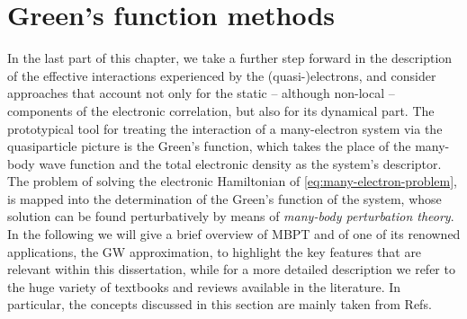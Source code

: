 \section{Green's function methods\label{sec:green-function-methods}}
In the last part of this chapter, we take a further step forward in the description of the effective interactions experienced by the (quasi-)electrons, and consider approaches that account not only for the static -- although non-local -- components of the electronic correlation, but also for its dynamical part. The prototypical tool for treating the interaction of a many-electron system via the quasiparticle picture is the Green's function, which takes the place of the many-body wave function and the total electronic density as the system's descriptor. The problem of solving the electronic Hamiltonian of \cref{eq:many-electron-problem}, is mapped into the determination of the Green's function of the system, whose solution can be found perturbatively by means of \emph{many-body perturbation theory}. In the following we will give a brief overview of MBPT and of one of its renowned applications, the GW approximation, to highlight the key features that are relevant within this dissertation, while for a more detailed description we refer to the huge variety of textbooks and reviews available in the literature. In particular, the concepts discussed in this section are mainly taken from Refs.~\cite{martin_interacting_2016,fetter_quantum_1971,reining_gw_2018,onida_electronic_2002}

